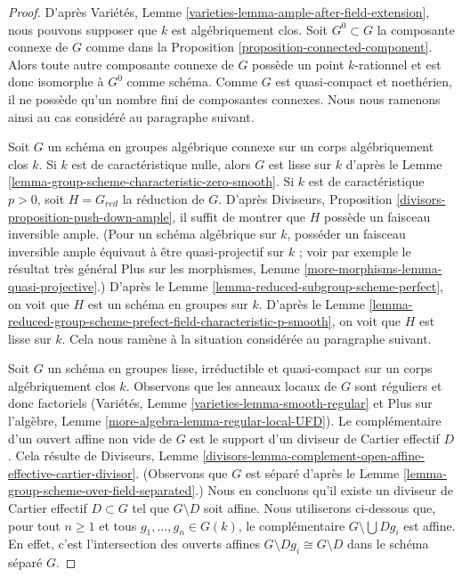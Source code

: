 \begin{proof}
D'après Variétés, Lemme \ref{varieties-lemma-ample-after-field-extension},
nous pouvons supposer que $k$ est algébriquement clos. Soit $G^0 \subset G$
la composante connexe de $G$ comme dans la
Proposition \ref{proposition-connected-component}.
Alors toute autre composante connexe de $G$ possède un point $k$-rationnel
et est donc isomorphe à $G^0$ comme schéma.
Comme $G$ est quasi-compact et noethérien, il ne possède qu'un nombre fini de
composantes connexes. Nous nous ramenons ainsi au cas considéré au
paragraphe suivant.

\medskip\noindent
Soit $G$ un schéma en groupes algébrique connexe sur un corps algébriquement clos
$k$. Si $k$ est de caractéristique nulle, alors $G$ est lisse sur
$k$ d'après le Lemme \ref{lemma-group-scheme-characteristic-zero-smooth}.
Si $k$ est de caractéristique $p > 0$, soit $H = G_{red}$
la réduction de $G$. D'après
Diviseurs, Proposition \ref{divisors-proposition-push-down-ample},
il suffit de montrer que $H$ possède un faisceau inversible ample.
(Pour un schéma algébrique sur $k$, posséder un faisceau inversible
ample équivaut à être quasi-projectif sur $k$ ; voir
par exemple le résultat très général
Plus sur les morphismes, Lemme \ref{more-morphisms-lemma-quasi-projective}.)
D'après le Lemme \ref{lemma-reduced-subgroup-scheme-perfect},
on voit que $H$ est un schéma en groupes sur $k$.
D'après le Lemme \ref{lemma-reduced-group-scheme-prefect-field-characteristic-p-smooth},
on voit que $H$ est lisse sur $k$.
Cela nous ramène à la situation considérée au
paragraphe suivant.

\medskip\noindent
Soit $G$ un schéma en groupes lisse, irréductible et quasi-compact sur un
corps algébriquement clos $k$. Observons que les anneaux locaux de $G$
sont réguliers et donc factoriels
(Variétés, Lemme \ref{varieties-lemma-smooth-regular} et
Plus sur l'algèbre, Lemme \ref{more-algebra-lemma-regular-local-UFD}).
Le complémentaire d'un ouvert affine non vide de $G$
est le support d'un diviseur de Cartier effectif $D$.
Cela résulte de Diviseurs, Lemme
\ref{divisors-lemma-complement-open-affine-effective-cartier-divisor}.
(Observons que $G$ est séparé d'après le
Lemme \ref{lemma-group-scheme-over-field-separated}.)
Nous en concluons qu'il existe un diviseur de Cartier effectif $D \subset G$
tel que $G \setminus D$ soit affine. Nous utiliserons ci-dessous que,
pour tout $n \geq 1$ et tous $g_1, \ldots, g_n \in G(k)$, le complémentaire
$G \setminus \bigcup D g_i$ est affine. En effet, c'est l'intersection
des ouverts affines $G \setminus Dg_i \cong G \setminus D$
dans le schéma séparé $G$.


\end{proof}

